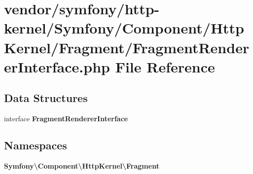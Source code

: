 \section{vendor/symfony/http-\/kernel/\+Symfony/\+Component/\+Http\+Kernel/\+Fragment/\+Fragment\+Renderer\+Interface.php File Reference}
\label{_fragment_renderer_interface_8php}
\subsection*{Data Structures}
\begin{DoxyCompactItemize}
\item 
interface {\bf Fragment\+Renderer\+Interface}
\end{DoxyCompactItemize}
\subsection*{Namespaces}
\begin{DoxyCompactItemize}
\item 
 {\bf Symfony\textbackslash{}\+Component\textbackslash{}\+Http\+Kernel\textbackslash{}\+Fragment}
\end{DoxyCompactItemize}
